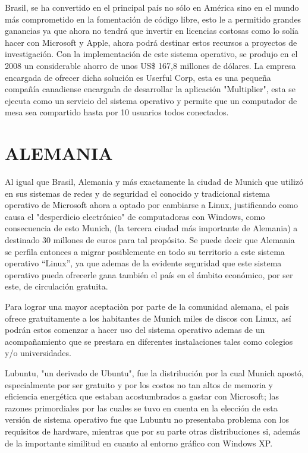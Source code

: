 Brasil, se ha convertido en el principal país no sólo en América sino en el mundo más comprometido en la fomentación de código libre, esto le a permitido grandes ganancias ya que 
ahora no tendrá que invertir en licencias costosas como lo solía hacer con Microsoft y Apple, ahora podrá destinar estos recursos a proyectos de investigación. Con la 
implementación de este sistema operativo, se produjo en el 2008 un considerable ahorro de unos US\$ 167,8 millones de dólares. La empresa encargada de ofrecer dicha solución es 
Userful Corp, esta es una pequeña compañía canadiense encargada de desarrollar la aplicación "Multiplier", esta se ejecuta como un servicio del sistema operativo y permite que un 
computador de mesa sea compartido hasta por 10 usuarios todos conectados. 


\section*{ALEMANIA}
Al igual que Brasil, Alemania y más exactamente la ciudad de Munich que utilizó en sus sistemas de redes y de seguridad el conocido y tradicional sistema operativo de Microsoft 
ahora a optado por cambiarse a Linux, justificando como causa el "desperdicio electrónico" de computadoras con Windows, como consecuencia de esto Munich, (la tercera ciudad más 
importante de Alemania) a destinado 30 millones de euros para tal propósito. Se puede decir que Alemania se perfila entonces a migrar posiblemente en todo su territorio a este 
sistema operativo “Linux”, ya que ademas de la evidente seguridad que este sistema operativo pueda ofrecerle gana también el país en el ámbito económico, por ser este, de 
circulación gratuita.                      
                                                                                                                                  
Para lograr una mayor aceptaciòn por parte de la comunidad alemana, el paìs ofrece gratuitamente a los habitantes de Munich  miles de discos con Linux, así podrán estos comenzar 
a hacer uso del sistema operativo ademas de un acompañamiento que se prestara en diferentes instalaciones tales como colegios y/o universidades.               
                                                                                                                                 
Lubuntu, "un derivado de Ubuntu", fue la distribución por la cual Munich apostó, especialmente por ser gratuito y por los costos no tan altos de memoria y eficiencia energética 
que estaban acostumbrados a gastar con Microsoft; las razones primordiales por las cuales se tuvo en cuenta en la elección de esta versión de sistema operativo fue que Lubuntu no 
presentaba problema con los requisitos de hardware, mientras que por su parte otras distribuciones si, además de la importante similitud en cuanto al entorno gráfico con Windows 
XP.                                                              
                                                                                                                                 
